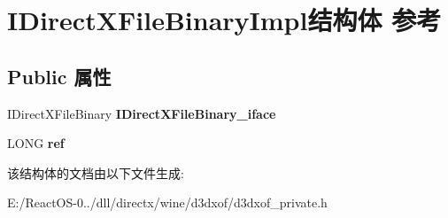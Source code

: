 \hypertarget{struct_i_direct_x_file_binary_impl}{}\section{I\+Direct\+X\+File\+Binary\+Impl结构体 参考}
\label{struct_i_direct_x_file_binary_impl}
\subsection*{Public 属性}
\begin{DoxyCompactItemize}
\item 
\mbox{\label{struct_i_direct_x_file_binary_impl_a7f35234016e5a6fd98ff9eb19a70b38f}} 
I\+Direct\+X\+File\+Binary {\bfseries I\+Direct\+X\+File\+Binary\+\_\+iface}
\item 
\mbox{\label{struct_i_direct_x_file_binary_impl_a715c7db8f5859cc9d446ea80d57bd7d7}} 
L\+O\+NG {\bfseries ref}
\end{DoxyCompactItemize}


该结构体的文档由以下文件生成\+:\begin{DoxyCompactItemize}
\item 
E\+:/\+React\+O\+S-\/0../dll/directx/wine/d3dxof/d3dxof\+\_\+private.\+h\end{DoxyCompactItemize}
